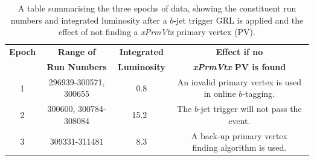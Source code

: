 \begin{table}[!htb]
  \begin{center}
  \begin{tabular}{ | c || c | c | c |}
    \hline			
    \textbf{Epoch}                     & \textbf{Range of}           & \textbf{Integrated} & \textbf{Effect if no } \\ 
    \textbf{}                     & \textbf{Run Numbers}           & \textbf{Luminosity} & \textbf{\textit{xPrmVtx} PV is found} \\ \hline
    \parbox[c]{0.2cm}{\vspace{0.5em}1} & \parbox[t]{4 cm} {296939-300571, 300655} & \parbox[c]{1cm}{\vspace{0.5em}~0.8~\ifb{}}
    & \parbox[t]{4.5cm} {An invalid primary vertex \\is used in online $b$-tagging. \vspace{0.2em}} \\
    \hline                                                                                                                            
    \parbox[c]{0.2cm}{\vspace{0.5em}2} & \parbox[t]{4 cm} {300600, 300784-308084} & \parbox[c]{1.2cm}{\vspace{0.5em}15.2~\ifb{}}
    & \parbox[t]{4.5cm}{The $b$-jet trigger will not \\pass the event. \vspace{0.2em} }\\
    \hline                                                                                                                            
    \parbox[c]{0.2cm}{\vspace{0.5em}3} &  \parbox[t]{4 cm} {309331-311481}        & \parbox[c]{1cm}{\vspace{0.5em}~8.3~\ifb{}}
    & \parbox[t]{4.5cm} {A back-up primary vertex \\ finding algorithm is used.\vspace{0.2em}} \\
    \hline
  \end{tabular}
  \end{center}
  \caption[A table summarising the three epochs of data, showing the constituent run numbers and integrated luminosity after a $b$-jet trigger GRL is applied and the
    effect of not finding a \textit{xPrmVtx} primary vertex. ]
          {A table summarising the three epochs of data, showing the constituent run numbers and integrated luminosity after a $b$-jet trigger GRL is applied and the
            effect of not finding a \textit{xPrmVtx} primary vertex (PV).}
  \label{tab:trig-epochs}
  \vspace{-0.5em}
\end{table}

